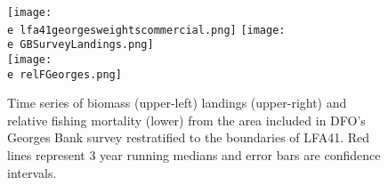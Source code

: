 \documentclass[11pt]{article}
\newcommand{\e}{/backup/bio_data/bio.lobster/figures/} %
\begin{document}
\begin{figure}

    \texttt{[image: \\e lfa41georgesweightscommercial.png]}
    \texttt{[image: \\e GBSurveyLandings.png]} \\
    \texttt{[image: \\e relFGeorges.png]} \\
    \caption{Time series of biomass (upper-left) landings (upper-right) and relative fishing mortality (lower) from the area included in DFO's Georges Bank survey restratified to the boundaries of LFA41. Red lines represent 3 year running medians and error bars are confidence intervals.}

\end{figure}
\end{document}
